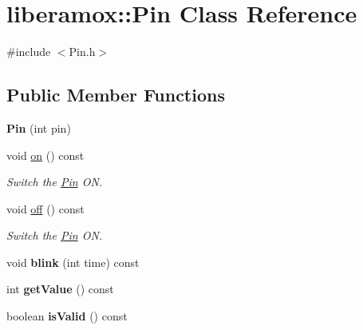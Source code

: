 \hypertarget{classliberamox_1_1Pin}{}\section{liberamox\+:\+:Pin Class Reference}
\label{classliberamox_1_1Pin}


{\ttfamily \#include $<$Pin.\+h$>$}

\subsection*{Public Member Functions}
\begin{DoxyCompactItemize}
\item 
{\bfseries Pin} (int pin)\hypertarget{classliberamox_1_1Pin_abb503c4126b6d0d9cdb25f1f2e2d6f79}{}\label{classliberamox_1_1Pin_abb503c4126b6d0d9cdb25f1f2e2d6f79}

\item 
void \hyperlink{classliberamox_1_1Pin_a221dee279c637542274509aef028e96d}{on} () const \hypertarget{classliberamox_1_1Pin_a221dee279c637542274509aef028e96d}{}\label{classliberamox_1_1Pin_a221dee279c637542274509aef028e96d}

\begin{DoxyCompactList}\small\item\em Switch the \hyperlink{classliberamox_1_1Pin}{Pin} ON. \end{DoxyCompactList}\item 
void \hyperlink{classliberamox_1_1Pin_a925e38096e1b000dcee10a431072f4a6}{off} () const \hypertarget{classliberamox_1_1Pin_a925e38096e1b000dcee10a431072f4a6}{}\label{classliberamox_1_1Pin_a925e38096e1b000dcee10a431072f4a6}

\begin{DoxyCompactList}\small\item\em Switch the \hyperlink{classliberamox_1_1Pin}{Pin} ON. \end{DoxyCompactList}\item 
void {\bfseries blink} (int time) const \hypertarget{classliberamox_1_1Pin_a1ae44a2bd9928d18f4f7f7150ad0f86a}{}\label{classliberamox_1_1Pin_a1ae44a2bd9928d18f4f7f7150ad0f86a}

\item 
int {\bfseries get\+Value} () const \hypertarget{classliberamox_1_1Pin_ad7a9b544674f5264af56591366ab7f65}{}\label{classliberamox_1_1Pin_ad7a9b544674f5264af56591366ab7f65}

\item 
boolean {\bfseries is\+Valid} () const \hypertarget{classliberamox_1_1Pin_aa9b1533ed4df8771c28cd4bb42d80e29}{}\label{classliberamox_1_1Pin_aa9b1533ed4df8771c28cd4bb42d80e29}


\end{DoxyCompactItemize}
